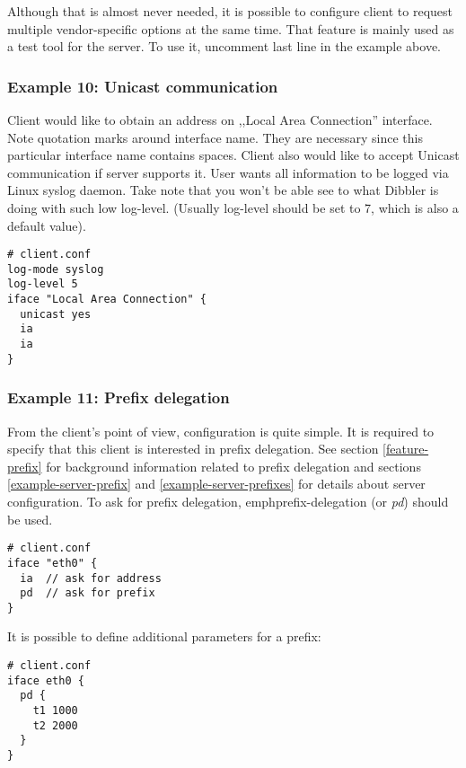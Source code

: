 Although that is almost never needed, it is possible to configure
client to request multiple vendor-specific options at the same
time. That feature is mainly used as a test tool for the server. To
use it, uncomment last line in the example above.

\subsubsection{Example 10: Unicast communication}

Client would like to obtain an address on ,,Local Area Connection''
interface. Note quotation marks around
interface name. They are necessary since this particular interface name
contains spaces. Client also would like to accept Unicast
communication if server supports it. User wants all information
to be logged via Linux syslog daemon. Take note that you won't be
able see to what Dibbler is doing with such low log-level. (Usually
log-level should be set to 7, which is also a default value).

\begin{lstlisting}
# client.conf
log-mode syslog
log-level 5
iface "Local Area Connection" {
  unicast yes
  ia
  ia
}
\end{lstlisting}

\subsubsection{Example 11: Prefix delegation}
\label{example-client-prefix}
From the client's point of view, configuration is quite simple. It is
required to specify that this client is interested in prefix
delegation. See section \ref{feature-prefix} for background
information related to prefix delegation and sections
\ref{example-server-prefix} and \ref{example-server-prefixes} for
details about server configuration. To ask for prefix delegation,
emph{prefix-delegation} (or \emph{pd}) should be used.

\begin{lstlisting}
# client.conf
iface "eth0" {
  ia  // ask for address
  pd  // ask for prefix
}
\end{lstlisting}

It is possible to define additional parameters for a prefix:

\begin{lstlisting}
# client.conf
iface eth0 {
  pd {
    t1 1000
    t2 2000
  }
}
\end{lstlisting}

